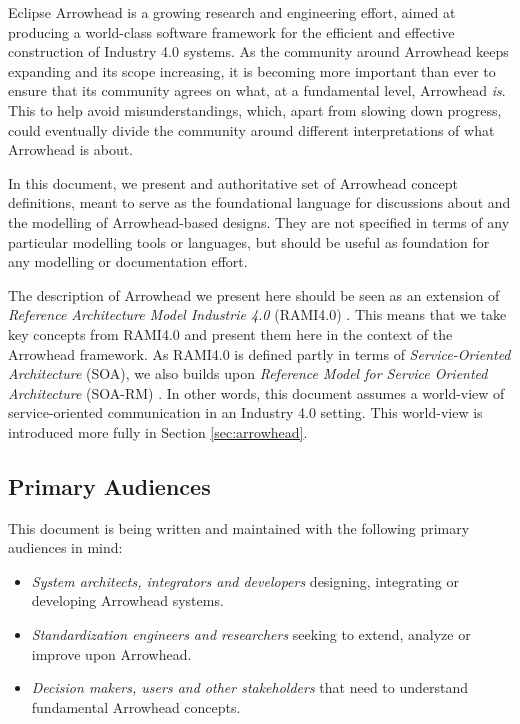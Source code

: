 %
%

Eclipse Arrowhead is a growing research and engineering effort, aimed at producing a world-class software framework for the efficient and effective construction of Industry 4.0 systems.
As the community around Arrowhead keeps expanding and its scope increasing, it is becoming more important than ever to ensure that its community agrees on what, at a fundamental level, Arrowhead \textit{is}.
This to help avoid misunderstandings, which, apart from slowing down progress, could eventually divide the community around different interpretations of what Arrowhead is about.

In this document, we present and authoritative set of Arrowhead concept definitions, meant to serve as the foundational language for discussions about and the modelling of Arrowhead-based designs.
They are not specified in terms of any particular modelling tools or languages, but should be useful as foundation for any modelling or documentation effort.

The description of Arrowhead we present here should be seen as an extension of \textit{Reference Architecture Model Industrie 4.0} (RAMI4.0) \cite{adolphs2016reference}.
This means that we take key concepts from RAMI4.0 and present them here in the context of the Arrowhead framework.
As RAMI4.0 is defined partly in terms of \textit{Service-Oriented Architecture} (SOA), we also builds upon \textit{Reference Model for Service Oriented Architecture} (SOA-RM) \cite{mackenzie2006reference}.
In other words, this document assumes a world-view of service-oriented communication in an Industry 4.0 setting.
This world-view is introduced more fully in Section \ref{sec:arrowhead}.

\subsection{Primary Audiences}
\label{sec:introduction:audiences}

This document is being written and maintained with the following primary audiences in mind:

\begin{itemize}
\item \textit{System architects, integrators and developers} designing, integrating or developing Arrowhead systems.
\item \textit{Standardization engineers and researchers} seeking to extend, analyze or improve upon Arrowhead.
\item \textit{Decision makers, users and other stakeholders} that need to understand fundamental Arrowhead concepts.
\end{itemize}

